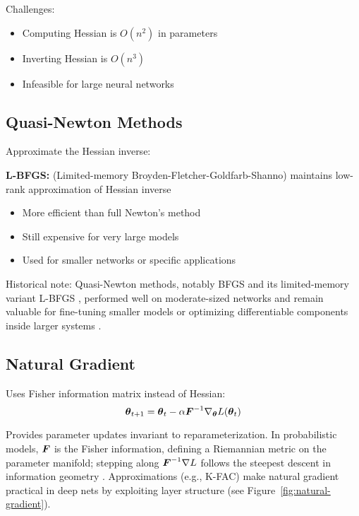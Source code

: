 Challenges:
\begin{itemize}
    \item Computing Hessian is $O(n^2)$ in parameters
    \item Inverting Hessian is $O(n^3)$
    \item Infeasible for large neural networks
\end{itemize}

\subsection{Quasi-Newton Methods}

Approximate the Hessian inverse:

\textbf{L-BFGS:} (Limited-memory Broyden-Fletcher-Goldfarb-Shanno) maintains low-rank approximation of Hessian inverse
\begin{itemize}
    \item More efficient than full Newton's method
    \item Still expensive for very large models
    \item Used for smaller networks or specific applications
\end{itemize}

Historical note: Quasi-Newton methods, notably BFGS and its limited-memory variant L-BFGS \cite{LiuNocedal1989}, performed well on moderate-sized networks and remain valuable for fine-tuning smaller models or optimizing differentiable components inside larger systems \cite{GoodfellowEtAl2016,Bishop2006}.

\subsection{Natural Gradient}

Uses Fisher information matrix instead of Hessian:
\begin{equation}
\boldsymbol{\theta}_{t+1} = \boldsymbol{\theta}_t - \alpha \boldsymbol{F}^{-1} \nabla_{\boldsymbol{\theta}} L(\boldsymbol{\theta}_t)
\end{equation}

Provides parameter updates invariant to reparameterization. In probabilistic models, \(\boldsymbol{F}\) is the Fisher information, defining a Riemannian metric on the parameter manifold; stepping along \(\boldsymbol{F}^{-1}\nabla L\) follows the steepest descent in information geometry \cite{Amari1998}. Approximations (e.g., K-FAC) make natural gradient practical in deep nets by exploiting layer structure (see Figure~\ref{fig:natural-gradient}).

